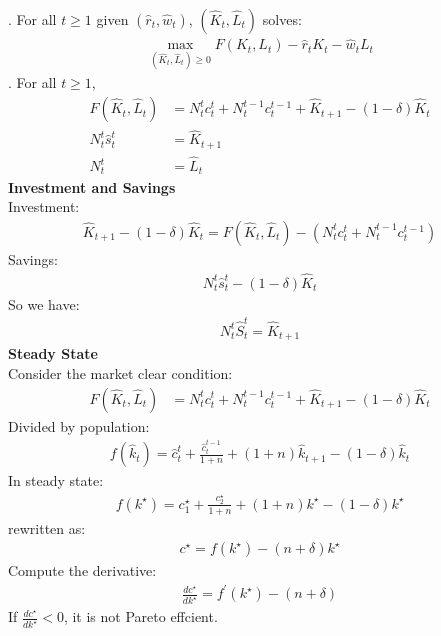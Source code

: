 \documentclass{article}
\begin{document}
. For all $t \geq 1$ given $(\hat{r}_t, \hat{w}_t)$, $(\hat{K}_t, \hat{L}_t)$ solves:
	\begin{align*}
		\mathop{max}\limits_{(\hat{K}_t, \hat{L}_t) \geq 0} F(K_t, L_t) - \hat{r}_t K_t - \hat{w}_t L_t
	\end{align*}
. For all $t \geq 1$,
	\begin{align*}
		F(\hat{K}_t, \hat{L}_t) &= N^t_t c^t_t + N^{t-1}_t c^{t-1}_t + \hat{K}_{t+1} - (1 - \delta)\hat{K}_t\\
		N^t_t \hat{s}^t_t &= \hat{K}_{t+1}\\
		N^t_t &= \hat{L}_t
	\end{align*}
\textbf{Investment and Savings}\\
\indent Investment:
	\begin{align*}
		\hat{K}_{t+1} - (1 - \delta)\hat{K}_t = F(\hat{K}_t, \hat{L}_t) - (N^t_t c^t_t + N^{t-1}_t c^{t-1}_t)
	\end{align*}
\indent Savings:
	\begin{align*}
		N^t_t \hat{s}^t_t - 	(1 - \delta)\hat{K}_t
	\end{align*}
\indent So we have:
	\begin{align*}
		N^t_t \hat{S}^t_t = \hat{K}_{t+1}
	\end{align*}
\textbf{Steady State}\\
\indent Consider the market clear condition:
	\begin{align*}
		F(\hat{K}_t, \hat{L}_t) &= N^t_t c^t_t + N^{t-1}_t c^{t-1}_t + \hat{K}_{t+1} - (1 - \delta)\hat{K}_t
	\end{align*}
\indent Divided by population:
	\begin{align*}
		f(\hat{k}_t) = \hat{c}^t_t + \frac{\hat{c}^{t-1}_t}{1 + n} + (1 + n) \hat{k}_{t+1} - (1 - \delta) \hat{k}_t
	\end{align*}
\indent In steady state:
	\begin{align*}
		f(k^\star) = c^\star_1 + \frac{c^\star_2}{1 + n} + (1 + n)k^\star - (1 - \delta)k^\star
	\end{align*}
\indent rewritten as:
	\begin{align*}
		c^\star = f(k^\star) - (n + \delta)k^\star
	\end{align*}
\indent Compute the derivative:
	\begin{align*}
		\frac{d c^\star}{d k^\star} = f^\prime (k^\star) - (n + \delta)
	\end{align*}
\indent If $\frac{d c^\star}{d k^\star} < 0$, it is not Pareto effcient.
\end{document}
